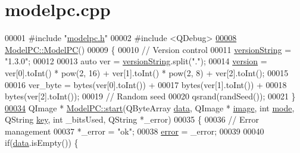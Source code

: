 \hypertarget{modelpc_8cpp_source}{}\section{modelpc.\+cpp}
\label{modelpc_8cpp_source}

\begin{DoxyCode}
00001 \textcolor{preprocessor}{#include "\mbox{\hyperlink{modelpc_8h}{modelpc.h}}"}
00002 \textcolor{preprocessor}{#include <QDebug>}
\mbox{\hyperlink{class_model_p_c_ae12ebe65ec973c02a0de4850a7c1e31c}{00008}} \mbox{\hyperlink{class_model_p_c_ae12ebe65ec973c02a0de4850a7c1e31c}{ModelPC::ModelPC}}()
00009 \{
00010     \textcolor{comment}{// Version control}
00011     \mbox{\hyperlink{class_model_p_c_a5f426725ccf7eefd3c77ea8c720264c9}{versionString}} = \textcolor{stringliteral}{"1.3.0"};
00012 
00013     \textcolor{keyword}{auto} ver = \mbox{\hyperlink{class_model_p_c_a5f426725ccf7eefd3c77ea8c720264c9}{versionString}}.split(\textcolor{stringliteral}{"."});
00014     \mbox{\hyperlink{class_model_p_c_a5af48ab89e19be42a94c34ba00249401}{version}} = ver[0].toInt() * pow(2, 16) + ver[1].toInt() * pow(2, 8) + ver[2].toInt();
00015 
00016     ver\_byte = bytes(ver[0].toInt()) +
00017             bytes(ver[1].toInt()) +
00018             bytes(ver[2].toInt());
00019     \textcolor{comment}{// Random seed}
00020     qsrand(randSeed());
00021 \}
\mbox{\hyperlink{class_model_p_c_a3cae34fd5bcb06e8c1f8cfe7961bd270}{00034}} QImage * \mbox{\hyperlink{class_model_p_c_a3cae34fd5bcb06e8c1f8cfe7961bd270}{ModelPC::start}}(QByteArray \mbox{\hyperlink{namespace_errors_dict_setup_af570460846fb9f0c91abd308a095dcdc}{data}}, QImage * \mbox{\hyperlink{namespacetests-setup_ad55b685280f549e15688a94cbb89f512}{image}}, \textcolor{keywordtype}{int} 
      \mbox{\hyperlink{namespacetests-setup_a04126d10edec6b3171e1b55a00309b23}{mode}}, QString \mbox{\hyperlink{namespace_errors_dict_setup_a09c268098d09ffb8e5504f30fa6d5dd9}{key}}, \textcolor{keywordtype}{int} \_bitsUsed, QString *\_error)
00035 \{
00036     \textcolor{comment}{// Error management}
00037     *\_error = \textcolor{stringliteral}{"ok"};
00038     \mbox{\hyperlink{class_model_p_c_a4e5a9c0ca1f06fe5bc478b6bf248c37c}{error}} = \_error;
00039 
00040     \textcolor{keywordflow}{if}(\mbox{\hyperlink{namespace_errors_dict_setup_af570460846fb9f0c91abd308a095dcdc}{data}}.isEmpty()) \{

\end{DoxyCode}
